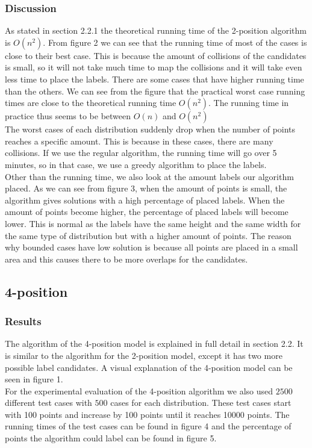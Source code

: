 \documentclass[crop=false,a4paper,oneside,11pt]{standalone}
\begin{document}
\subsubsection{Discussion}
As stated in section 2.2.1 the theoretical running time of the 2-position algorithm is $O(n^2)$. From figure 2 we can see that the running time of most of the cases is close to their best case. This is because the amount of collisions of the candidates is small, so it will not take much time to map the collisions and it will take even less time to place the labels. There are some cases that have higher running time than the others. We can see from the figure that the practical worst case running times are close to the theoretical running time $O(n^2)$. The running time in practice thus seems to be between $O(n)$ and $O(n^2)$ \\
The worst cases of each distribution suddenly drop when the number of points reaches a specific amount. This is because in these cases, there are many collisions. If we use the regular algorithm, the running time will go over 5 minutes, so in that case, we use a greedy algorithm to place the labels.\\
Other than the running time, we also look at the amount labels our algorithm placed. As we can see from figure 3, when the amount of points is small, the algorithm gives solutions with a high percentage of placed labels. When the amount of points become higher, the percentage of placed labels will become lower. This is normal as the labels have the same height and the same width for the same type of distribution but with a higher amount of points. The reason why bounded cases have low solution is because all points are placed in a small area and this causes there to be more overlaps for the candidates.\\


\subsection{4-position}
\subsubsection{Results}
The algorithm of the 4-position model is explained in full detail in section 2.2. It is similar to the algorithm for the 2-position model, except it has two more possible label candidates. A visual explanation of the 4-position model can be seen in figure 1.\\
 For the experimental evaluation of the 4-position algorithm we also used $2500$ different test cases with $500$ cases for each distribution. These test cases start with 100 points and increase by 100 points until it reaches 10000 points. The running times of the test cases can be found in figure 4 and the percentage of points the algorithm could label can be found in figure 5.\\
\end{document}
